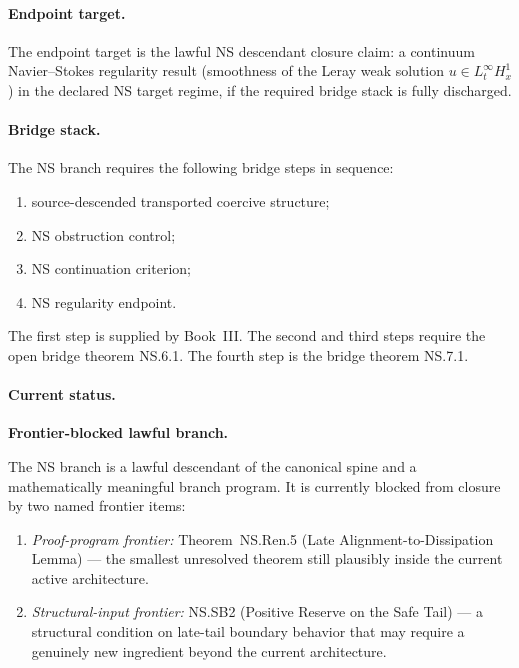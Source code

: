 \documentclass[12pt,oneside]{amsbook}
\theoremstyle{plain}
\theoremstyle{definition}
\theoremstyle{remark}
\begin{document}
\paragraph{Endpoint target.}
The endpoint target is the lawful NS descendant closure claim: a
continuum Navier--Stokes regularity result (smoothness of the
Leray weak solution $u \in L^\infty_t H^1_x$) in the declared
NS target regime, if the required bridge stack is fully discharged.

\paragraph{Bridge stack.}
The NS branch requires the following bridge steps in sequence:
\begin{enumerate}[label=\textup{(\arabic*)}]
 \item source-descended transported coercive structure;
 \item NS obstruction control;
 \item NS continuation criterion;
 \item NS regularity endpoint.
\end{enumerate}
The first step is supplied by Book~III. The second and third
steps require the open bridge theorem NS.6.1. The fourth
step is the bridge theorem NS.7.1.

\paragraph{Current status.}
\textbf{Frontier-blocked lawful branch.}

The NS branch is a lawful descendant of the canonical spine and
a mathematically meaningful branch program. It is currently
blocked from closure by two named frontier items:
\begin{enumerate}[label=\textup{(\arabic*)}]
 \item \emph{Proof-program frontier:} Theorem~NS.Ren.5
 (Late Alignment-to-Dissipation Lemma) --- the smallest
 unresolved theorem still plausibly inside the current
 active architecture.
 \item \emph{Structural-input frontier:} NS.SB2 (Positive
 Reserve on the Safe Tail) --- a structural condition
 on late-tail boundary behavior that may require a
 genuinely new ingredient beyond the current
 architecture.
\end{enumerate}

\bigskip

\end{document}
